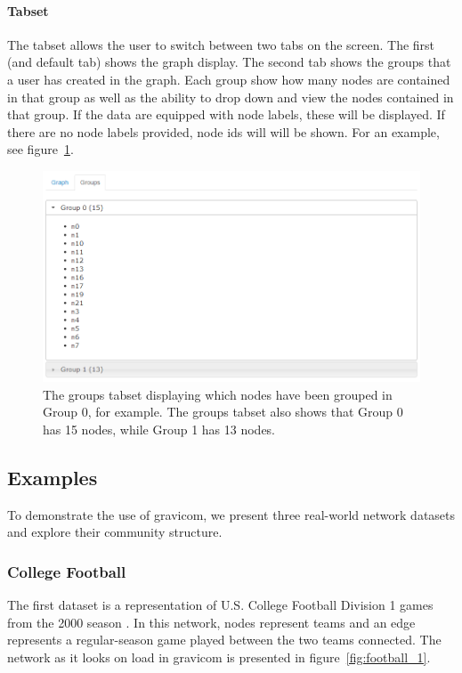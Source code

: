 \documentclass{article}\usepackage[]{graphicx}\usepackage[]{color}
\begin{document}
\paragraph{Tabset}
The tabset allows the user to switch between two tabs on the screen. The first (and default tab) shows the graph display. The second tab shows the groups that a user has created in the graph. Each group show how many nodes are contained in that group as well as the ability to drop down and view the nodes contained in that group. If the data are equipped with node labels, these will be displayed. If there are no node labels provided, node ids will will be shown. For an example, see figure~\ref{fig:groupstab}.

\begin{figure}[hbtp]
\centering
\includegraphics[width=\textwidth]{images/groupstab.png}
\caption{\label{fig:groupstab} The groups tabset displaying which nodes have been grouped in Group 0, for example. The groups tabset also shows that Group 0 has 15 nodes, while Group 1 has 13 nodes.}
\end{figure}


\subsection{Examples}

To demonstrate the use of gravicom, we present three real-world network datasets and explore their community structure.

\subsubsection{College Football}
The first dataset is a representation of U.S. College Football Division 1 games from the 2000 season \cite{gn-football}. In this network, nodes represent teams and an edge represents a regular-season game played between the two teams connected. The network as it looks on load in gravicom is presented in figure~\ref{fig:football_1}. 
\end{document}
